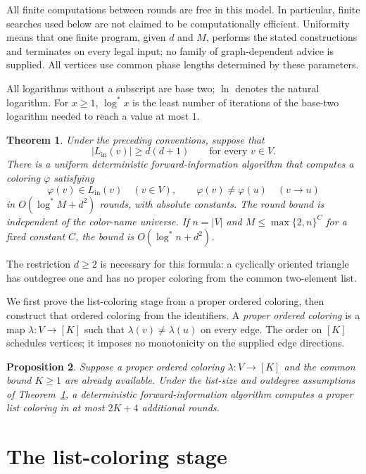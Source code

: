\documentclass[11pt,a4paper]{article}
\numberwithin{equation}{section}
\newtheorem{theorem}{Theorem}[section]
\newtheorem{proposition}[theorem]{Proposition}
\newcommand{\Lin}{L_{\mathrm{in}}}
\newcommand{\logstar}{\log^{*}}
\begin{document}
All finite computations between rounds are free in this model.
In particular, finite searches used below are not claimed to be
computationally efficient. Uniformity means that one finite program,
given \(d\) and \(M\), performs the stated constructions and terminates
on every legal input; no family of graph-dependent advice is supplied.
All vertices use common phase lengths determined by these parameters.

All logarithms without a subscript are base two; \(\ln\) denotes the
natural logarithm. For \(x\geq1\), \(\logstar x\) is the least number
of iterations of the base-two logarithm needed to reach a value
at most \(1\).

\begin{theorem}
\label{thm:main}
Under the preceding conventions, suppose that
\[
 |\Lin(v)|\geq d(d+1)\qquad\text{for every }v\in V.
\]
There is a uniform deterministic forward-information algorithm that
computes a coloring \(\varphi\) satisfying
\[
 \varphi(v)\in\Lin(v)\quad(v\in V),\qquad
 \varphi(v)\neq\varphi(u)\quad(v\to u)
\]
in \(O(\logstar M+d^2)\) rounds, with absolute constants.
The round bound is independent of the color-name universe.
If \(n=|V|\) and \(M\leq\max\{2,n\}^{C}\) for a fixed constant \(C\),
the bound is \(O(\logstar n+d^2)\).
\end{theorem}

The restriction \(d\geq2\) is necessary for this formula: a cyclically
oriented triangle has outdegree one and has no proper coloring from
the common two-element list.

We first prove the list-coloring stage from a proper ordered coloring,
then construct that ordered coloring from the identifiers.
A \emph{proper ordered coloring} is a map
\(\lambda:V\to[K]\) such that
\(\lambda(v)\neq\lambda(u)\) on every edge.
The order on \([K]\) schedules vertices; it imposes no monotonicity on
the supplied edge directions.

\begin{proposition}
\label{prop:liststage}
Suppose a proper ordered coloring \(\lambda:V\to[K]\) and the common
bound \(K\geq1\) are already available. Under the list-size and
outdegree assumptions of Theorem~\ref{thm:main}, a deterministic
forward-information algorithm computes a proper list coloring in
at most \(2K+4\) additional rounds.
\end{proposition}

\section{The list-coloring stage}
\label{sec:liststage}
\end{document}
